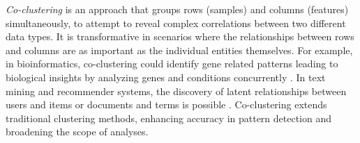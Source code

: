 \textit{Co-clustering}\cite{cheng2000BiclusteringExpressionData, kluger2003SpectralBiclusteringMicroarray, yan2017CoclusteringMultidimensionalBig} is an approach that groups rows (samples) and columns (features) simultaneously, to attempt to reveal complex correlations between two different data types. It is transformative in scenarios where the relationships between rows and columns are as important as the individual entities themselves. For example, in bioinformatics, co-clustering could identify gene related patterns leading to biological insights by analyzing genes and conditions concurrently \cite{higham2007SpectralClusteringIts, kluger2003SpectralBiclusteringMicroarray, madeira2004BiclusteringAlgorithmsBiological, zhao2012BiclusteringAnalysisPattern, golchev2015BiclusteringAnalysisGene}. In text mining and recommender systems, the discovery of latent relationships between users and items or documents and terms is possible \cite{busygin2008BiclusteringDataMining, dhillon2001CoclusteringDocumentsWords, dhillon2007WeightedGraphCuts, chen2023ParallelNonNegativeMatrix, bouchareb2019ModelBasedCoclustering}. Co-clustering extends traditional clustering methods, enhancing accuracy in pattern detection and broadening the scope of analyses.

